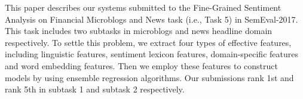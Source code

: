 This paper describes our systems submitted to the Fine-Grained Sentiment Analysis on Financial Microblogs and News task (i.e., Task 5) in SemEval-2017. This task includes two subtasks in microblogs and news headline domain respectively. To settle this problem, we extract four types of effective features, including linguistic features, sentiment lexicon features, domain-specific features and word embedding features. Then we employ these features to construct models by using ensemble regression algorithms. Our submissions rank 1st and rank 5th in subtask 1 and subtask 2 respectively.
